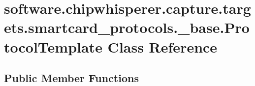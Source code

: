 \hypertarget{classsoftware_1_1chipwhisperer_1_1capture_1_1targets_1_1smartcard__protocols_1_1__base_1_1ProtocolTemplate}{}\section{software.\+chipwhisperer.\+capture.\+targets.\+smartcard\+\_\+protocols.\+\_\+base.\+Protocol\+Template Class Reference}
\label{classsoftware_1_1chipwhisperer_1_1capture_1_1targets_1_1smartcard__protocols_1_1__base_1_1ProtocolTemplate}
\subsection*{Public Member Functions}
